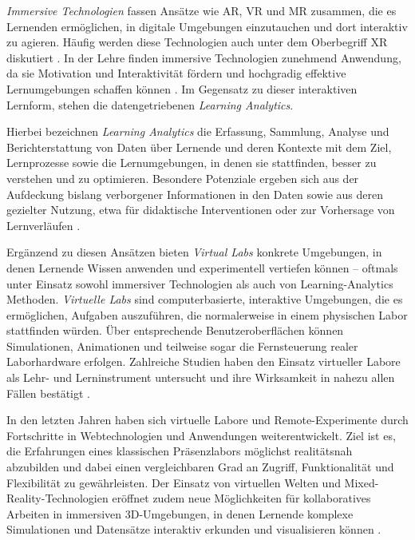 \textit{Immersive Technologien} fassen Ansätze wie \acs{AR}, \acs{VR} und \acs{MR} zusammen, die es Lernenden ermöglichen, in digitale Umgebungen einzutauchen und dort interaktiv zu agieren. Häufig werden diese Technologien auch unter dem Oberbegriff \acs{XR} diskutiert \parencites[S.~82]{alnagrat_review_2022}[S.~256]{chen_information_2024}. In der Lehre finden immersive Technologien zunehmend Anwendung, da sie Motivation und Interaktivität fördern und hochgradig effektive Lernumgebungen schaffen können \parencite[S.~1]{izouaouen_education_2025}. Im Gegensatz zu dieser interaktiven Lernform, stehen die datengetriebenen \textit{Learning Analytics}.

Hierbei bezeichnen \textit{Learning Analytics} die Erfassung, Sammlung, Analyse und Berichterstattung von Daten über Lernende und deren Kontexte mit dem Ziel, Lernprozesse sowie die Lernumgebungen, in denen sie stattfinden, besser zu verstehen und zu optimieren. Besondere Potenziale ergeben sich aus der Aufdeckung bislang verborgener Informationen in den Daten sowie aus deren gezielter Nutzung, etwa für didaktische Interventionen oder zur Vorhersage von Lernverläufen \parencite[S.~294]{xiao_applying_2019}.

Ergänzend zu diesen Ansätzen bieten \textit{Virtual Labs} konkrete Umgebungen, in denen Lernende Wissen anwenden und experimentell vertiefen können – oftmals unter Einsatz sowohl immersiver Technologien als auch von Learning-Analytics Methoden. \textit{Virtuelle Labs} sind computerbasierte, interaktive Umgebungen, die es ermöglichen, Aufgaben auszuführen, die normalerweise in einem physischen Labor stattfinden würden. Über entsprechende Benutzeroberflächen können Simulationen, Animationen und teilweise sogar die Fernsteuerung realer Laborhardware erfolgen. Zahlreiche Studien haben den Einsatz virtueller Labore als Lehr- und Lerninstrument untersucht und ihre Wirksamkeit in nahezu allen Fällen bestätigt \parencite[S.~117]{achuthan_value_2011}.

In den letzten Jahren haben sich virtuelle Labore und Remote-Experimente durch Fortschritte in Webtechnologien und Anwendungen weiterentwickelt. Ziel ist es, die Erfahrungen eines klassischen Präsenzlabors möglichst realitätsnah abzubilden und dabei einen vergleichbaren Grad an Zugriff, Funktionalität und Flexibilität zu gewährleisten. Der Einsatz von virtuellen Welten und Mixed-Reality-Technologien eröffnet zudem neue Möglichkeiten für kollaboratives Arbeiten in immersiven 3D-Umgebungen, in denen Lernende komplexe Simulationen und Datensätze interaktiv erkunden und visualisieren können \parencite[S.~1]{savin-baden_understanding_2012}.

